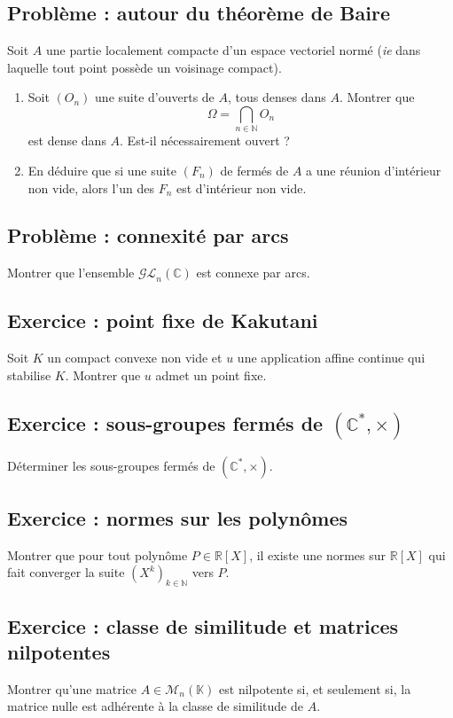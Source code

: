 \documentclass[french]{book}
\newcommand{\N}{\mathbb{N}}
\newcommand{\R}{\mathbb{R}}
\newcommand{\C}{\mathbb{C}}
\newcommand{\K}{\mathbb{K}}
\newcommand{\st}{^*}
\begin{document}
\subsection{Problème : autour du théorème de Baire}
Soit $A$ une partie localement compacte d'un espace vectoriel normé (\textit{ie} dans laquelle tout point possède un voisinage compact).
\begin{enumerate}
	\item Soit $(O_n)$ une suite d'ouverts de $A$, tous denses dans $A$. Montrer que $$\Omega=\bigcap_{n\in\N} O_n$$ est dense dans $A$. Est-il nécessairement ouvert ?
	\item En déduire que si une suite $(F_n)$ de fermés de $A$ a une réunion d'intérieur non vide, alors l'un des $F_n$ est d'intérieur non vide.
\end{enumerate}

\subsection{Problème : connexité par arcs}
Montrer que l'ensemble $\mathcal{GL}_n(\C)$ est connexe par arcs.

\subsection{Exercice : point fixe de Kakutani}
Soit $K$ un compact convexe non vide et $u$ une application affine continue qui stabilise $K$. Montrer que $u$ admet un point fixe.

\subsection{Exercice : sous-groupes fermés de $(\C\st,\times)$}
Déterminer les sous-groupes fermés de $(\C\st,\times)$.

\subsection{Exercice : normes sur les polynômes}
Montrer que pour tout polynôme $P\in\R[X]$, il existe une normes sur $\R[X]$ qui fait converger la suite $(X^k)_{k\in\N}$ vers $P$.

\subsection{Exercice : classe de similitude et matrices nilpotentes}
Montrer qu'une matrice $A\in\mathcal{M}_n(\K)$ est nilpotente si, et seulement si, la matrice nulle est adhérente à la classe de similitude de $A$.
\end{document}
